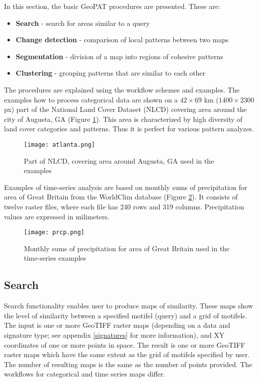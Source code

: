 In this section, the basic GeoPAT procedures are presented. These are: 

\begin{itemize}
	\item {\bf Search} - search for areas similar to a query
	\item {\bf Change detection} - comparison of local patterns between two maps
	\item {\bf Segmentation} - division of a map into regions of cohesive patterns
	\item {\bf Clustering} - grouping patterns that are similar to each other
\end{itemize}

The procedures are explained using the workflow schemes and examples.
The examples how to process categorical data are shown on a $42\times 69$ km ($1400\times 2300$ px) part of the National Land Cover Dataset (NLCD) covering area around the city of Augusta, GA (Figure \ref{FIG:AUGUSTA}).
This area is characterized by high diversity of land cover categories and patterns.
Thus it is perfect for various pattern analyzes.

\begin{figure}[H]
	\centering
	\texttt{[image: atlanta.png]}
	\caption{Part of NLCD, covering area around Augusta, GA used in the examples}
	\label{FIG:AUGUSTA}
\end{figure}

Examples of time-series analysis are based on monthly sums of precipitation for area of Great Britain from the WorldClim database (Figure \ref{FIG:PRCP}).
It consists of twelve raster files, where each file has 240 rows and 319 columns.
Precipitation values are expressed in milimeters.

\begin{figure}[H]
	\centering
	\texttt{[image: prcp.png]}
	\caption{Monthly sums of precipitation for area of Great Britain used in the time-series examples}
	\label{FIG:PRCP}
\end{figure}

\FloatBarrier

\subsection{Search}

Search functionality enables user to produce maps of similarity. 
These maps show the level of similarity between a specified motifel (query) and a grid of motifels.
The input is one or more GeoTIFF raster maps (depending on a data and signature type; see appendix \ref{signatures} for more information), and XY coordinates of one or more points in space.
The result is one or more GeoTIFF raster maps which have the same extent as the grid of motifels specified by user.
The number of resulting maps is the same as the number of points provided.
The workflows for categorical and time series maps differ.

